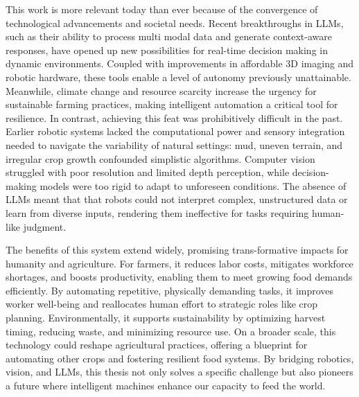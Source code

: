 This work is more relevant today than ever because of the convergence of technological advancements and societal needs. Recent breakthroughs in LLMs, such as their ability to process multi modal data and generate context-aware responses, have opened up new possibilities for real-time decision making in dynamic environments. Coupled with improvements in affordable 3D imaging and robotic hardware, these tools enable a level of autonomy previously unattainable. Meanwhile, climate change and resource scarcity increase the urgency for sustainable farming practices, making intelligent automation a critical tool for resilience. In contrast, achieving this feat was prohibitively difficult in the past. Earlier robotic systems lacked the computational power and sensory integration needed to navigate the variability of natural settings: mud, uneven terrain, and irregular crop growth confounded simplistic algorithms. Computer vision struggled with poor resolution and limited depth perception, while decision-making models were too rigid to adapt to unforeseen conditions. The absence of LLMs meant that that robots could not interpret complex, unstructured data or learn from diverse inputs, rendering them ineffective for tasks requiring human-like judgment.

The benefits of this system extend widely, promising trans-formative impacts for humanity and agriculture. For farmers, it reduces labor costs, mitigates workforce shortages, and boosts productivity, enabling them to meet growing food demands efficiently. By automating repetitive, physically demanding tasks, it improves worker well-being and reallocates human effort to strategic roles like crop planning. Environmentally, it supports sustainability by optimizing harvest timing, reducing waste, and minimizing resource use. On a broader scale, this technology could reshape agricultural practices, offering a blueprint for automating other crops and fostering resilient food systems. By bridging robotics, vision, and LLMs, this thesis not only solves a specific challenge but also pioneers a future where intelligent machines enhance our capacity to feed the world.


